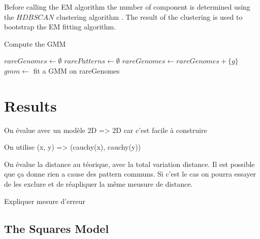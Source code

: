 \documentclass[10pt,letterpaper]{article}
\theoremstyle{definition}
\theoremstyle{remark}
\begin{document}
Before calling the EM algorithm the number of component is determined using the $HDBSCAN$ clustering algorithm \cite{mcinnes2017hdbscan}. The result of the clustering is used to bootstrap the EM fitting algorithm.


\begin{algorithm}
    \caption{Compute the GMM}
    \label{algo:computeGMM}
    \begin{algorithmic}[1]
       \State $rareGenomes \gets \emptyset$
       \State $rarePatterns \gets \emptyset$
       \Statex
         \State $rareGenomes \gets rareGenomes + \{g\}$
         \EndIf
       \EndFor
       \Statex
       \State \Return{$\emptyset$}
       \Else 
       \State $gmm \gets$ fit a GMM on rareGenomes
       \State {}
       \EndIf
    \EndFunction
    \end{algorithmic}
\end{algorithm}

\section*{Results}
\label{sec. evaluation}

On évalue avec un modèle 2D => 2D car c'est facile à construire

On utilise (x, y) => (cauchy(x), cauchy(y))


On évalue la distance au téorique, avec la total variation distance.
Il est possible que ça donne rien a cause des pattern communs.
Si c'est le cas on pourra essayer de les exclure et de réapliquer la même meusure de distance.


Expliquer mesure d'erreur


\subsection*{The Squares Model}
\end{document}
